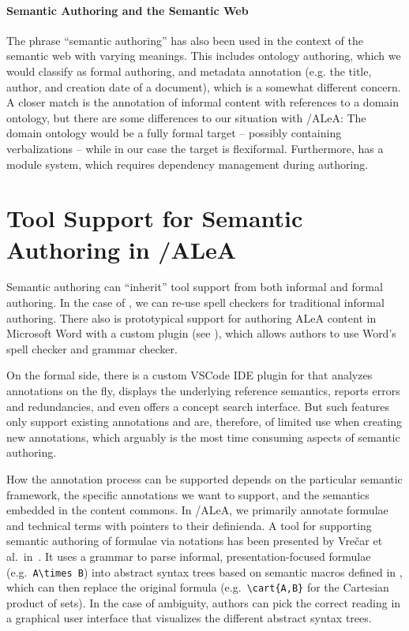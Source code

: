 \documentclass[runningheads]{llncs}
\newcommand\ALeA{\textsf{ALeA}\xspace}
\begin{document}
\paragraph{Semantic Authoring and the Semantic Web}
The phrase ``semantic authoring'' has also been used in the context of the semantic web
with varying meanings.  This includes ontology authoring, which we would classify as
formal authoring, and metadata annotation (e.g. the title, author, and creation date of a
document), which is a somewhat different concern.  A closer match is the annotation of
informal content with references to a domain ontology, but there are some differences to
our situation with \sTeX/\ALeA: The domain ontology would be a fully formal target --
possibly containing verbalizations -- while in our case the target is flexiformal.
Furthermore, \sTeX has a module system, which requires dependency management during
authoring.

\section{Tool Support for Semantic Authoring in \sTeX/\ALeA}\label{sec:tools}

Semantic authoring can ``inherit'' tool support from both informal and formal authoring.
In the case of \sTeX, we can re-use spell checkers for traditional informal authoring.
There also is prototypical support for authoring \ALeA content in Microsoft Word with a
custom plugin (see \cite{KohKoh:woide24}), which allows authors to use Word's spell
checker and grammar checker.

On the formal side, there is a custom VSCode IDE plugin for \sTeX \cite{sTeX-IDE:git} that
analyzes annotations on the fly, displays the underlying reference semantics, reports
errors and redundancies, and even offers a concept search interface.  But such features
only support existing annotations and are, therefore, of limited use when creating new
annotations, which arguably is the most time consuming aspects of semantic authoring.

How the annotation process can be supported depends on the particular semantic framework,
the specific annotations we want to support, and the semantics embedded in the content
commons.  In \sTeX/\ALeA, we primarily annotate formulae and technical terms with pointers
to their definienda.  A tool for supporting semantic authoring of formulae via notations
has been presented by Vre{\v{c}}ar et al.\ in~\cite{VreWelKam:tsmmdui24}.  It uses a
grammar to parse informal, presentation-focused formulae (e.g.\
\lstinline[keywordstyle={}]|A\times B|) into abstract syntax trees based on semantic
macros defined in \sTeX, which can then replace the original formula (e.g.\
\lstinline|\cart{A,B}| for the Cartesian product of sets).  In the case of ambiguity,
authors can pick the correct reading in a graphical user interface that visualizes the
different abstract syntax trees.
\end{document}
